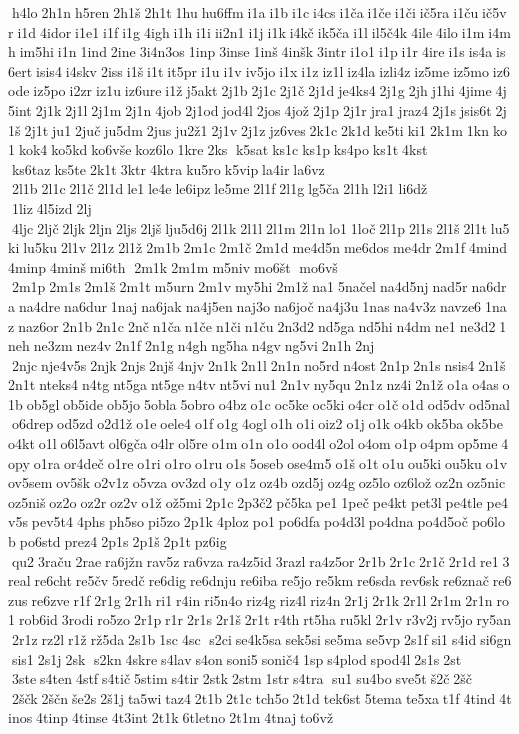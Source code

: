  h4lo 2h1n h5ren 2h1š 2h1t 1hu hu6ffm i1a i1b i1c i4cs i1ča i1če i1či ič5ra i1ču ič5vr i1d 4idor i1e1 i1f i1g 4igh i1h i1i ii2n1 i1j i1k i4kč ik5ča i1l il5č4k 4ile 4ilo i1m i4mh im5hi i1n 1ind 2ine 3i4n3os 1inp 3inse 1inš 4inšk 3intr i1o1 i1p i1r 4ire i1s is4a is6ert isis4 i4skv 2iss i1š i1t it5pr i1u i1v iv5jo i1x i1z iz1l iz4la izli4z iz5me iz5mo iz6ode iz5po i2zr iz1u iz6ure i1ž j5akt 2j1b 2j1c 2j1č 2j1d je4ks4 2j1g 2jh j1hi 4jime 4j5int 2j1k 2j1l 2j1m 2j1n 4job 2j1od jod4l 2jos 4jož 2j1p 2j1r jra1 jraz4 2j1s jsis6t 2j1š 2j1t ju1 2juč ju5dm 2jus ju2ž1 2j1v 2j1z jz6ves 2k1c 2k1d ke5ti ki1 2k1m 1kn ko1 kok4 ko5kd ko6vše koz6lo 1kre 2ks  k5sat ks1c ks1p ks4po ks1t 4kst  ks6taz ks5te 2k1t 3ktr 4ktra ku5ro k5vip la4ir la6vz  2l1b 2l1c 2l1č 2l1d le1 le4e le6ipz le5me 2l1f 2l1g lg5ča 2l1h l2i1 li6dž  1liz 4l5izd 2lj  4ljc 2ljč 2ljk 2ljn 2ljs 2ljš lju5d6j 2l1k 2l1l 2l1m 2l1n lo1 1loč 2l1p 2l1s 2l1š 2l1t lu5ki lu5ku 2l1v 2l1z 2l1ž 2m1b 2m1c 2m1č 2m1d me4d5n me6dos me4dr 2m1f 4mind 4minp 4minš mi6th  2m1k 2m1m m5niv mo6št  mo6vš  2m1p 2m1s 2m1š 2m1t m5urn 2m1v my5hi 2m1ž na1 5načel na4d5nj nad5r na6dra na4dre na6dur 1naj na6jak na4j5en naj3o na6joč na4j3u 1nas na4v3z navze6 1naz naz6or 2n1b 2n1c 2nč n1ča n1če n1či n1ču 2n3d2 nd5ga nd5hi n4dm ne1 ne3d2 1neh ne3zm nez4v 2n1f 2n1g n4gh ng5ha n4gv ng5vi 2n1h 2nj  2njc nje4v5s 2njk 2njs 2njš 4njv 2n1k 2n1l 2n1n no5rd n4ost 2n1p 2n1s nsis4 2n1š 2n1t nteks4 n4tg nt5ga nt5ge n4tv nt5vi nu1 2n1v ny5qu 2n1z nz4i 2n1ž o1a o4as o1b ob5gl ob5ide ob5jo 5obla 5obro o4bz o1c oc5ke oc5ki o4cr o1č o1d od5dv od5nal o6drep od5zd o2d1ž o1e oele4 o1f o1g 4ogl o1h o1i oiz2 o1j o1k o4kb ok5ba ok5be o4kt o1l o6l5avt ol6gča o4lr ol5re o1m o1n o1o ood4l o2ol o4om o1p o4pm op5me 4opy o1ra or4deč o1re o1ri o1ro o1ru o1s 5oseb ose4m5 o1š o1t o1u ou5ki ou5ku o1v ov5sem ov5šk o2v1z o5vza ov3zd o1y o1z oz4b ozd5j oz4g oz5lo oz6lož oz2n oz5nic oz5niš oz2o oz2r oz2v o1ž ož5mi 2p1c 2p3č2 pč5ka pe1 1peč pe4kt pet3l pe4tle pe4v5s pev5t4 4phs ph5so pi5zo 2p1k 4ploz po1 po6dfa po4d3l po4dna po4d5oč po6lob po6std prez4 2p1s 2p1š 2p1t pz6ig  qu2 3raču 2rae ra6jžn rav5z ra6vza ra4z5id 3razl ra4z5or 2r1b 2r1c 2r1č 2r1d re1 3real re6cht re5čv 5redč re6dig re6dnju re6iba re5jo re5km re6sda rev6sk re6znač re6zus re6zve r1f 2r1g 2r1h ri1 r4in ri5n4o riz4g riz4l riz4n 2r1j 2r1k 2r1l 2r1m 2r1n ro1 rob6id 3rodi ro5zo 2r1p r1r 2r1s 2r1š 2r1t r4th rt5ha ru5kl 2r1v r3v2j rv5jo ry5an 2r1z rz2l r1ž rž5da 2s1b 1sc 4sc  s2ci se4k5sa sek5si se5ma se5vp 2s1f si1 s4id si6gn  sis1 2s1j 2sk  s2kn 4skre s4lav s4on soni5 sonič4 1sp s4plod spod4l 2s1s 2st  3ste s4ten 4stf s4tič 5stim s4tir 2stk 2stm 1str s4tra  su1 su4bo sve5t š2č 2šč  2ščk 2ščn še2s 2š1j ta5wi taz4 2t1b 2t1c tch5o 2t1d tek6st 5tema te5xa t1f 4tind 4tinos 4tinp 4tinse 4t3int 2t1k 6tletno 2t1m 4tnaj to6vž 